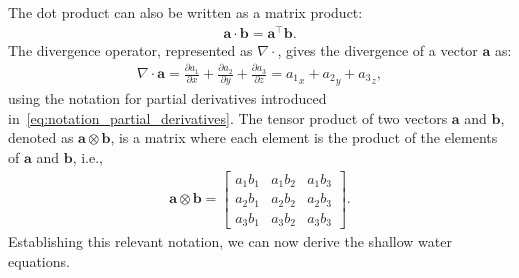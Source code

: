The dot product can also be written as a matrix product:
\begin{align*}
    \mathbf{a} \cdot \mathbf{b} = \mathbf{a}^\top \mathbf{b}.
\end{align*}
The divergence operator, represented as $\nabla \cdot $, gives the divergence of a vector $\mathbf{a}$ as:
\begin{align*}
    \nabla \cdot \mathbf{a} = \frac{\partial a_1}{\partial x} + \frac{\partial a_2}{\partial y} + \frac{\partial a_3}{\partial z} = {a_1}_x + {a_2}_y + {a_3}_z,
\end{align*}
using the notation for partial derivatives introduced in~\eqref{eq:notation_partial_derivatives}.
The tensor product of two vectors $\mathbf{a}$ and $\mathbf{b}$, denoted as $\mathbf{a} \otimes \mathbf{b}$, is a matrix where each element is the product of the elements of $\mathbf{a}$ and $\mathbf{b}$, i.e.,
\begin{align*}
    \mathbf{a} \otimes \mathbf{b} = \begin{bmatrix}
        a_1 b_1 & a_1 b_2 & a_1 b_3 \\
        a_2 b_1 & a_2 b_2 & a_2 b_3 \\
        a_3 b_1 & a_3 b_2 & a_3 b_3
\end{bmatrix}.
\end{align*}
Establishing this relevant notation, we can now derive the shallow water equations.



